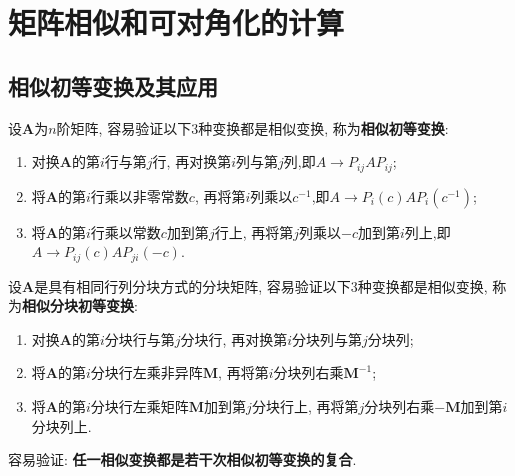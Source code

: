 \documentclass[../../main.tex]{subfiles}%
\begin{document}
\section{矩阵相似和可对角化的计算}

\subsection{相似初等变换及其应用}

\begin{proposition}[相似初等变换]\label{proposition:相似初等变换}
设\(\boldsymbol{A}\)为\(n\)阶矩阵, 容易验证以下\(3\)种变换都是相似变换, 称为\textbf{相似初等变换}:
\begin{enumerate}
\item 对换\(\boldsymbol{A}\)的第\(i\)行与第\(j\)行, 再对换第\(i\)列与第\(j\)列,即$A\rightarrow P_{ij}AP_{ij}$;
\item 将\(\boldsymbol{A}\)的第\(i\)行乘以非零常数\(c\), 再将第\(i\)列乘以\(c^{-1}\),即$A\rightarrow P_i\left( c \right) AP_i\left( c^{-1} \right) $;
\item 将\(\boldsymbol{A}\)的第\(i\)行乘以常数\(c\)加到第\(j\)行上, 再将第\(j\)列乘以\(-c\)加到第\(i\)列上,即$A\rightarrow P_{ij}\left( c \right) AP_{ji}\left( -c \right)$.
\end{enumerate}

设\(\boldsymbol{A}\)是具有相同行列分块方式的分块矩阵, 容易验证以下\(3\)种变换都是相似变换, 称为\textbf{相似分块初等变换}:
\begin{enumerate}
\item 对换\(\boldsymbol{A}\)的第\(i\)分块行与第\(j\)分块行, 再对换第\(i\)分块列与第\(j\)分块列;
\item 将\(\boldsymbol{A}\)的第\(i\)分块行左乘非异阵\(\boldsymbol{M}\), 再将第\(i\)分块列右乘\(\boldsymbol{M}^{-1}\);
\item 将\(\boldsymbol{A}\)的第\(i\)分块行左乘矩阵\(\boldsymbol{M}\)加到第\(j\)分块行上, 再将第\(j\)分块列右乘\(-\boldsymbol{M}\)加到第\(i\)分块列上.
\end{enumerate}

容易验证: \textbf{任一相似变换都是若干次相似初等变换的复合}.
\end{proposition}
\end{document}
